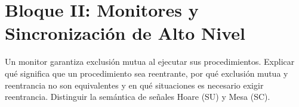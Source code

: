 \section{Bloque II: Monitores y Sincronización de Alto Nivel}

\begin{ejercicio}
Un monitor garantiza exclusión mutua al ejecutar sus procedimientos. Explicar qué significa que un procedimiento sea reentrante, por qué exclusión mutua y reentrancia no son equivalentes y en qué situaciones es necesario exigir reentrancia. Distinguir la semántica de señales Hoare (SU) y Mesa (SC).
\end{ejercicio}

